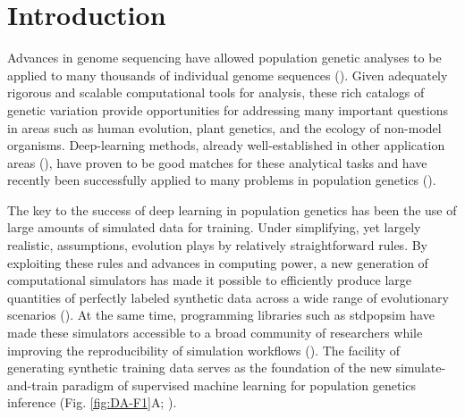 \section{Introduction}
Advances in genome sequencing have allowed population genetic analyses to be applied to many thousands of individual genome sequences (\cite{auton_global_2015,sudlow_uk_2015,karczewski_mutational_2020}). Given adequately rigorous and scalable computational tools for analysis, these rich catalogs of genetic variation provide opportunities for addressing many important questions in areas such as human evolution, plant genetics, and the ecology of non-model organisms. Deep-learning methods, already well-established in other application areas (\cite{lecun_deep_2015}), have proven to be good matches for these analytical tasks and have recently been successfully applied to many problems in population genetics (\cite{sheehan_deep_2016,kern_diploshic_2018,schrider_supervised_2018,flagel_unreasonable_2019,torada_imagene_2019,adrion_predicting_2020,caldas_inference_2022,hejase_deep-learning_2022,korfmann_deep_2023,huang_harnessing_2023}).

The key to the success of deep learning in population genetics has been the use of large amounts of simulated data for training. Under simplifying, yet largely realistic, assumptions, evolution plays by relatively straightforward rules. By exploiting these rules and advances in computing power, a new generation of computational simulators has made it possible to efficiently produce large quantities of perfectly labeled synthetic data across a wide range of evolutionary scenarios (\cite{haller_tree-sequence_2019,haller_slim_2019,baumdicker_efficient_2022}). At the same time, programming libraries such as stdpopsim have made these simulators accessible to a broad community of researchers while improving the reproducibility of simulation workflows (\cite{adrion_community-maintained_2020,lauterbur_expanding_2022}). The facility of generating synthetic training data serves as the foundation of the new simulate-and-train paradigm of supervised machine learning for population genetics inference (Fig. \ref{fig:DA-F1}A; \cite{schrider_supervised_2018,korfmann_deep_2023,huang_harnessing_2023}).


